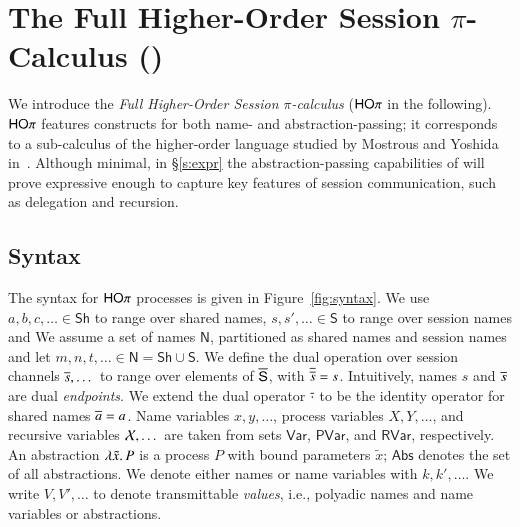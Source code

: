 
\section{The Full Higher-Order Session $\pi$-Calculus (\HOp)}

We introduce the {\em Full Higher-Order Session $\pi$-calculus}
($\mathsf{HO}\pi$ in the following).
$\mathsf{HO}\pi$ features constructs for both name- and abstraction-passing;
it corresponds to a sub-calculus 
of the higher-order language studied by Mostrous and Yoshida in~\cite{tlca07}.
Although minimal, in \S\ref{s:expr}
the abstraction-passing capabilities of \HOp will prove 
expressive enough to capture key features of session communication, 
such as delegation and recursion.

\subsection{Syntax}

The syntax for $\mathsf{HO}\pi$ processes is given in Figure~\ref{fig:syntax}.
We use $a,b,c, \dots \in \mathsf{Sh}$ to range over shared names,
$s, s', \dots \in \mathsf{S}$ to range over session names and
We assume a set of names $\mathsf{N}$, partitioned as shared names
and session names and let $m, n, t, \dots \in \mathsf{N} = \mathsf{Sh} \cup \mathsf{S}$.
We define the dual operation over session channels $\overline{s}, \dots$
to range over elements of $\overline{\mathsf{S}}$, with
$\overline{\overline{s}} = s$. 
Intuitively, names $s$ and $\overline{s}$ are dual \emph{endpoints}.
We extend the dual operator $\overline{\cdot}$
to be the identity operator for shared names $\overline{a} = a$.
Name variables $x, y,  \dots$, 
process variables $X, Y,  \dots$,
and recursive variables $\mathcal{X}, \dots$ 
are taken from sets $\mathsf{Var}$, $\mathsf{PVar}$, and $\mathsf{RVar}$, respectively. 
An abstraction $\lambda \tilde{x}.\,P$ is a process $P$ with bound parameters $\tilde{x}$;
$\mathsf{Abs}$ denotes the set of all abstractions.
We denote either names or name variables with $k, k', \dots$.
We write $V, V', \ldots$ to denote 
transmittable \emph{values}, i.e., 
polyadic names and name variables or abstractions.

